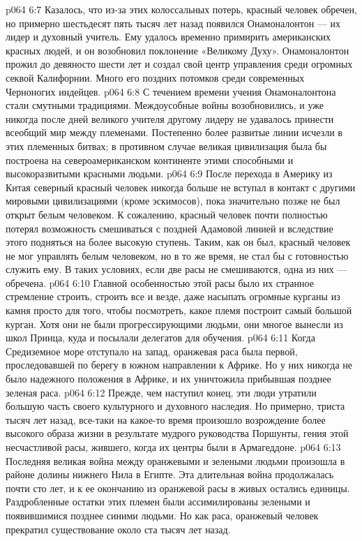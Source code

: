 \vs p064 6:7 Казалось, что из\hyp{}за этих колоссальных потерь, красный человек обречен, но примерно шестьдесят пять тысяч лет назад появился Онамоналонтон --- их лидер и духовный учитель. Ему удалось временно примирить американских красных людей, и он возобновил поклонение «Великому Духу». Онамоналонтон прожил до девяносто шести лет и создал свой центр управления среди огромных секвой Калифорнии. Много его поздних потомков среди современных Черноногих индейцев.
\vs p064 6:8 С течением времени учения Онамоналонтона стали смутными традициями. Междоусобные войны возобновились, и уже никогда после дней великого учителя другому лидеру не удавалось принести всеобщий мир между племенами. Постепенно более развитые линии исчезли в этих племенных битвах; в противном случае великая цивилизация была бы построена на североамериканском континенте этими способными и высокоразвитыми красными людьми.
\vs p064 6:9 После перехода в Америку из Китая северный красный человек никогда больше не вступал в контакт с другими мировыми цивилизациями (кроме эскимосов), пока значительно позже не был открыт белым человеком. К сожалению, красный человек почти полностью потерял возможность смешиваться с поздней Адамовой линией и вследствие этого подняться на более высокую ступень. Таким, как он был, красный человек не мог управлять белым человеком, но в то же время, не стал бы с готовностью служить ему. В таких условиях, если две расы не смешиваются, одна из них --- обречена.
\vs p064 6:10 \bibnobreakspace {} Главной особенностью этой расы было их странное стремление строить, строить все и везде, даже насыпать огромные курганы из камня просто для того, чтобы посмотреть, какое племя построит самый большой курган. Хотя они не были прогрессирующими людьми, они многое вынесли из школ Принца, куда и посылали делегатов для обучения.
\vs p064 6:11 Когда Средиземное море отступало на запад, оранжевая раса была первой, проследовавшей по берегу в южном направлении к Африке. Но у них никогда не было надежного положения в Африке, и их уничтожила прибывшая позднее зеленая раса.
\vs p064 6:12 Прежде, чем наступил конец, эти люди утратили большую часть своего культурного и духовного наследия. Но примерно, триста тысяч лет назад, все\hyp{}таки на какое\hyp{}то время произошло возрождение более высокого образа жизни в результате мудрого руководства Поршунты, гения этой несчастливой расы, жившего, когда их центры были в Армагеддоне.
\vs p064 6:13 Последняя великая война между оранжевыми и зелеными людьми произошла в районе долины нижнего Нила в Египте. Эта длительная война продолжалась почти сто лет, и к ее окончанию из оранжевой расы в живых остались единицы. Раздробленные остатки этих племен были ассимилированы зелеными и появившимися позднее синими людьми. Но как раса, оранжевый человек прекратил существование около ста тысяч лет назад.
